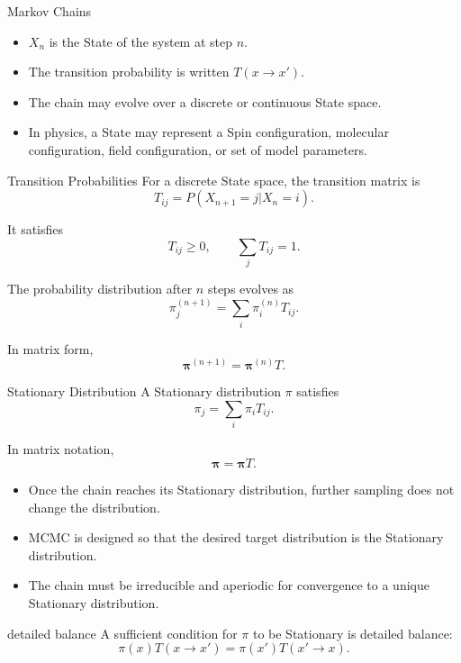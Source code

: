 \documentclass[a4paper, 10pt, onepage]{elegantbook}
\begin{document}
{\begin{frame}{Markov Chains}
  \begin{itemize}
    \item \(X_n\) is the State of the system at step \(n\).
    \item The transition probability is written \(T(x\to x')\).
    \item The chain may evolve over a discrete or continuous State space.
    \item In physics, a State may represent a Spin configuration, molecular configuration, field configuration, or set 
of model parameters.
  \end{itemize}
\end{frame}

\begin{frame}{Transition Probabilities}
  For a discrete State space, the transition matrix is
  \[
    T_{ij}=P(X_{n+1}=j|X_n=i).
  \]

  It satisfies
  \[
    T_{ij}\ge0,
    \qquad
    \sum_jT_{ij}=1.
  \]

  The probability distribution after \(n\) steps evolves as
  \[
    \pi^{(n+1)}_j
    =
    \sum_i\pi^{(n)}_iT_{ij}.
  \]

  In matrix form,
  \[
    \boldsymbol{\pi}^{(n+1)}
    =
    \boldsymbol{\pi}^{(n)}T.
  \]
\end{frame}

\begin{frame}{Stationary Distribution}
  A Stationary distribution \(\pi\) satisfies
  \[
    \pi_j
    =
    \sum_i\pi_iT_{ij}.
  \]

  In matrix notation,
  \[
    \boldsymbol{\pi}
    =
    \boldsymbol{\pi}T.
  \]

  \begin{itemize}
    \item Once the chain reaches its Stationary distribution, further sampling does not change the distribution.
    \item MCMC is designed so that the desired target distribution is the Stationary distribution.
    \item The chain must be irreducible and aperiodic for convergence to a unique Stationary distribution.
  \end{itemize}
\end{frame}

\begin{frame}{detailed balance}
  A sufficient condition for \(\pi\) to be Stationary is detailed balance:
  \[
    \pi(x)T(x\to x')
    =
    \pi(x')T(x'\to x).
  \]


\end{frame}}
\end{document}
